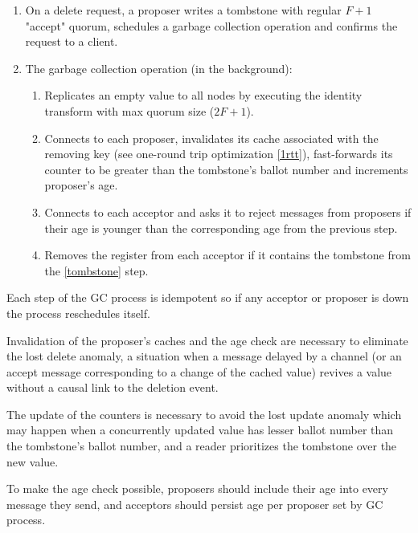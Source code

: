\documentclass[a4paper,USenglish]{lipics-v2018}
\theoremstyle{definition}
\begin{document}
    \begin{enumerate}
        \item On a delete request, a proposer writes a tombstone with regular $F+1$ "accept" quorum, schedules a garbage collection operation and confirms the request to a client.

        \item The garbage collection operation (in the background):\label{GC}

        \begin{enumerate}
            \item Replicates an empty value to all nodes by executing the identity transform with max quorum size ($2F+1$).\label{tombstone}

            \item Connects to each proposer, invalidates its cache associated with the removing key (see one-round trip optimization \ref{1rtt}), fast-forwards its counter to be greater than the tombstone's ballot number and increments proposer's age.

            \item Connects to each acceptor and asks it to reject messages from proposers if their age is younger than the corresponding age from the previous step.

            \item Removes the register from each acceptor if it contains the tombstone from the \ref{tombstone} step.
        \end{enumerate}
    \end{enumerate}

    Each step of the GC process is idempotent so if any acceptor or proposer is down the process reschedules itself.

    Invalidation of the proposer's caches and the age check are necessary to eliminate the lost delete anomaly, a situation when a message delayed by a channel (or an accept message corresponding to a change of the cached value) revives a value without a causal link to the deletion event.

    The update of the counters is necessary to avoid the lost update anomaly which may happen when a concurrently updated value has lesser ballot number than the tombstone's ballot number, and a reader prioritizes the tombstone over the new value.

    To make the age check possible, proposers should include their age into every message they send, and acceptors should persist age per proposer set by GC process.
\end{document}
